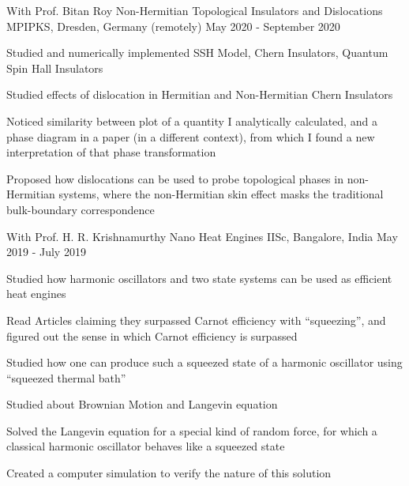\begin{cventries}
\cventry
{With Prof. Bitan Roy} %
{Non-Hermitian Topological Insulators and Dislocations} %
{MPIPKS, Dresden, Germany (remotely)} %
{May 2020 - September 2020} %
{
	\begin{cvitems} %
		\item {Studied and numerically implemented SSH Model, Chern Insulators, Quantum Spin Hall Insulators}
		\item {Studied effects of dislocation in Hermitian and Non-Hermitian Chern Insulators}
		\item {Noticed similarity between plot of a quantity I analytically calculated, and a phase diagram in a paper (in a different context), from which I found a new interpretation of that phase transformation}
		\item {Proposed how dislocations can be used to probe topological phases in non-Hermitian systems, where the non-Hermitian skin effect masks the traditional bulk-boundary correspondence}
	\end{cvitems}
}

  \cventry
    {With Prof. H. R. Krishnamurthy} %
    {Nano Heat Engines} %
    {IISc, Bangalore, India} %
    {May 2019 - July 2019} %
    {
      \begin{cvitems} %
        \item {Studied how harmonic oscillators and two state systems can be used as efficient heat engines}
        \item {Read Articles claiming they surpassed Carnot efficiency with ``squeezing'', and figured out the sense in which Carnot efficiency is surpassed}
        \item {Studied how one can produce such a squeezed state of a harmonic oscillator using ``squeezed thermal bath''}
        \item {Studied about Brownian Motion and Langevin equation}
        \item {Solved the Langevin equation for a special kind of random force, for which a classical harmonic oscillator behaves like a squeezed state}
        \item {Created a computer simulation to verify the nature of this solution}
      \end{cvitems}
    }


\end{cventries}
